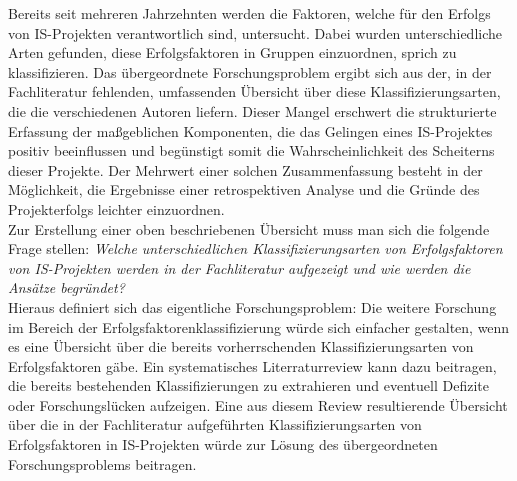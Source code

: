 Bereits seit mehreren Jahrzehnten werden die Faktoren, welche für den Erfolgs von IS-Pro\-jek\-ten verantwortlich sind, untersucht. Dabei wurden unterschiedliche Arten gefunden,
diese Erfolgsfaktoren in Gruppen einzuordnen, sprich zu klassifizieren.
Das ü\-ber\-ge\-ord\-ne\-te Forschungsproblem ergibt sich aus der, in der Fachliteratur fehlenden, umfassenden Ü\-ber\-sicht über diese Klassifizierungsarten, die die verschiedenen Autoren liefern.
Dieser Mangel erschwert die strukturierte Erfassung der maßgeblichen Komponenten, die das Gelingen eines IS-Projektes positiv beeinflussen und begünstigt somit die Wahrscheinlichkeit des Scheiterns dieser Projekte.
Der Mehrwert einer solchen Zusammenfassung besteht in der Möglichkeit, die Ergebnisse einer retrospektiven Analyse und die Gründe des Projekterfolgs leichter einzuordnen.
\\Zur Erstellung einer oben beschriebenen Übersicht muss man sich die folgende Frage stellen:
\textit{Welche unterschiedlichen Klassifizierungsarten von Erfolgsfaktoren von IS-Projekten werden in der Fachliteratur aufgezeigt und wie werden die Ansätze begründet?}\\
Hieraus definiert sich das eigentliche Forschungsproblem:
Die weitere Forschung im Bereich der Erfolgsfaktorenklassifizierung würde sich einfacher gestalten, wenn es eine Übersicht über die bereits vorherrschenden Klassifizierungsarten von Erfolgsfaktoren gäbe.
Ein systematisches Literraturreview kann dazu beitragen, die bereits bestehenden Klassifizierungen zu extrahieren und eventuell Defizite oder Forschungslücken aufzeigen.
Eine aus diesem Review resultierende Übersicht über die in der Fachliteratur aufgeführten Klassifizierungsarten von Erfolgsfaktoren in IS-Projekten würde zur Lösung des übergeordneten Forschungsproblems beitragen.